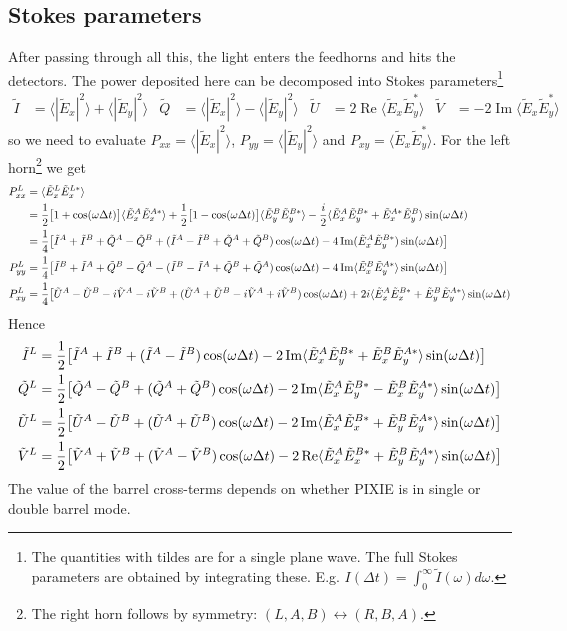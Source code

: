 \documentclass{article}
\renewcommand{\Re}{\operatorname{Re}}
\renewcommand{\Im}{\operatorname{Im}}
\newcommand{\I}{\tilde I}
\newcommand{\Q}{\tilde Q}
\newcommand{\U}{\tilde U}
\newcommand{\V}{\tilde V}
\newcommand{\J}{{\tilde E}}
\begin{document}
\subsection{Stokes parameters}
\label{sect:stokes}
After passing through all this, the light enters the feedhorns and
hits the detectors. The power deposited here can be decomposed into
Stokes parameters\footnote{The quantities with tildes are for a single plane wave.
The full Stokes parameters are obtained by integrating these. E.g. $I(\Delta t) =
	\int_0^\infty \I(\omega) d\omega$.}
\begin{align}
	\I &= \langle |\J_x|^2\rangle + \langle|\J_y|^2\rangle &
	\Q &= \langle |\J_x|^2\rangle - \langle|\J_y|^2\rangle &
	\U &= 2\Re\langle \J_x\J_y^*\rangle &
	\V &= -2\Im\langle \J_x\J_y^*\rangle
\end{align}
so we need to evaluate $P_{xx} = \langle |\J_x|^2\rangle$,
$P_{yy} = \langle |\J_y|^2\rangle$ and $P_{xy} = \langle \J_x\J_y^*\rangle$.
For the left horn\footnote{The right horn follows by symmetry: $(L,A,B)\leftrightarrow
(R,B,A)$.} we get
\begin{align}
	P^L_{xx} &= \langle \J^L_x\J^{L*}_x \rangle \notag \\
		&= \frac12\big[1+\cos(\omega\Delta t)\big]\langle\J^A_x\J^{A*}_x\rangle
		+ \frac12\big[1-\cos(\omega\Delta t)\big]\langle\J^B_y\J^{B*}_y\rangle
		- \frac{i}2\langle\J^A_x\J^{B*}_y + \J^{A*}_x\J^B_y\rangle\sin(\omega\Delta t) \notag \\
		&= \frac14\big[\I^A+\I^B+\Q^A-\Q^B + (\I^A-\I^B+\Q^A+\Q^B)\cos(\omega\Delta t) -
		4\Im(\J^A_x\J^{B*}_y)\sin(\omega\Delta t) \big] \\
	P^L_{yy} &= \frac14\big[\I^B+\I^A+\Q^B-\Q^A - (\I^B-\I^A+\Q^B+\Q^A)\cos(\omega\Delta t) -
		4\Im\langle\J^B_x\J^{A*}_y\rangle\sin(\omega\Delta t) \big ]\\
	P^L_{xy} &= \frac14\big[\U^A-\U^B - i\V^A-i\V^B + (\U^A+\U^B -i\V^A+i\V^B)\cos(\omega\Delta t)
		+2i\langle\J^A_x\J^{B*}_x+\J^B_y\J^{A*}_y\rangle\sin(\omega\Delta t)
\end{align}
Hence
\begin{align}
	\I^L &= \frac12\big[\I^A+\I^B+(\I^A-\I^B)\cos(\omega\Delta t)
		-2\Im\langle\J^A_x\J^{B*}_y+\J^B_x\J^{A*}_y\rangle\sin(\omega\Delta t) \big] \notag \\
	\Q^L &= \frac12\big[\Q^A-\Q^B+(\Q^A+\Q^B)\cos(\omega\Delta t)
		-2\Im\langle\J^A_x\J^{B*}_y-\J^B_x\J^{A*}_y\rangle\sin(\omega\Delta t) \big] \notag \\
	\U^L &= \frac12\big[\U^A-\U^B+(\U^A+\U^B)\cos(\omega\Delta t)
		-2\Im\langle\J^A_x\J^{B*}_x+\J^B_y\J^{A*}_y\rangle\sin(\omega\Delta t) \big] \notag \\
	\V^L &= \frac12\big[\V^A+\V^B+(\V^A-\V^B)\cos(\omega\Delta t)
		-2\Re\langle\J^A_x\J^{B*}_x+\J^B_y\J^{A*}_y\rangle\sin(\omega\Delta t) \big]
\end{align}
The value of the barrel cross-terms depends on whether PIXIE is in single
or double barrel mode.
\end{document}

